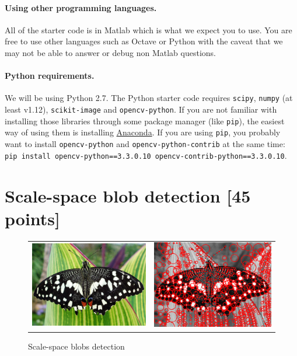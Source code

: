 \documentclass[10pt,letterpaper]{article}
\newcommand{\cmd}[1] {{\color{blue}\texttt{#1}}}
\begin{document}
\paragraph{Using other programming languages.} All of the starter code is in Matlab which is what we expect you to use. You are free to use other languages such as Octave or Python with the caveat that we may not be able to answer or debug non Matlab questions.

\paragraph{Python requirements.} We will be using Python 2.7. The Python starter code requires \cmd{scipy}, \cmd{numpy} (at least v1.12), \cmd{scikit-image} and \cmd{opencv-python}.
If you are not familiar with installing those libraries through some package manager (like \cmd{pip}), the easiest way of using them is installing \href{https://conda.io/docs/user-guide/install/index.html}{Anaconda}.
If you are using \cmd{pip}, you probably want to install \cmd{opencv-python} and \cmd{opencv-python-contrib} at the same time:
\\
\cmd{pip install opencv-python==3.3.0.10 opencv-contrib-python==3.3.0.10}.

\newpage

\section{Scale-space blob detection [45 points]}


\begin{figure}[h]
\centering
\begin{tabular}{cc}
\includegraphics[width=0.4\linewidth]{./fig/butterfly.jpg} &
\includegraphics[width=0.4\linewidth]{./fig/butterfly.png} \\
\end{tabular}
\caption{\label{fig:blobs} Scale-space blobs detection}
\end{figure}
\end{document}
